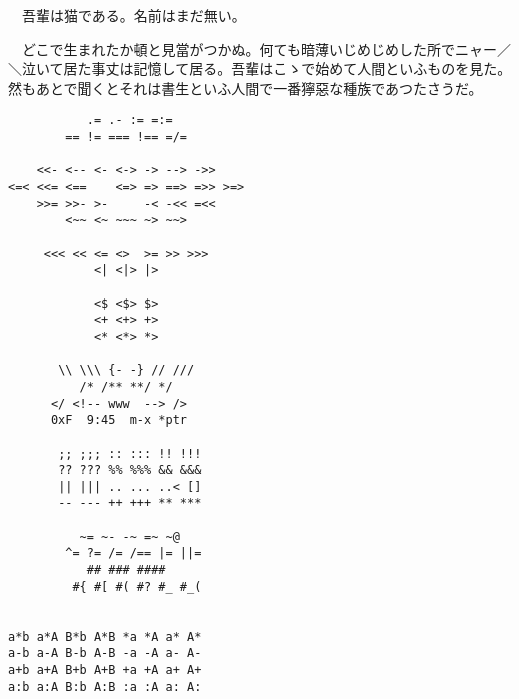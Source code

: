 \documentclass{ltjsarticle}
\begin{document}
　吾輩は猫である。名前はまだ無い。

　どこで生まれたか頓と見當がつかぬ。何ても暗薄いじめじめした所でニャー／＼泣いて居た事丈は記憶して居る。吾輩はこゝで始めて人間といふものを見た。然もあとで聞くとそれは書生といふ人間で一番獰惡な種族であつたさうだ。

\begin{verbatim}
           .= .- := =:=
        == != === !== =/=

    <<- <-- <- <-> -> --> ->>
<=< <<= <==    <=> => ==> =>> >=>
    >>= >>- >-     -< -<< =<<
        <~~ <~ ~~~ ~> ~~>

     <<< << <= <>  >= >> >>>
            <| <|> |>

            <$ <$> $>
            <+ <+> +>
            <* <*> *>

       \\ \\\ {- -} // ///
          /* /** **/ */
      </ <!-- www  --> />
      0xF  9:45  m-x *ptr

       ;; ;;; :: ::: !! !!!
       ?? ??? %% %%% && &&&
       || ||| .. ... ..< []
       -- --- ++ +++ ** ***

          ~= ~- -~ =~ ~@
        ^= ?= /= /== |= ||=
           ## ### ####
         #{ #[ #( #? #_ #_(


a*b a*A B*b A*B *a *A a* A*
a-b a-A B-b A-B -a -A a- A-
a+b a+A B+b A+B +a +A a+ A+
a:b a:A B:b A:B :a :A a: A:
\end{verbatim}
\end{document}
